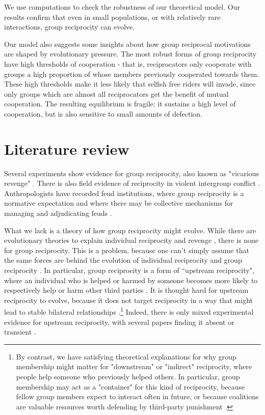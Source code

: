 \documentclass[12pt,a4paper]{article}
\begin{document}
We use computations to check the robustness of our theoretical model. Our
results confirm that even in small populations, or with relatively rare interactions,
group reciprocity can evolve.

Our model also suggests some insights
about how group reciprocal motivations are shaped by evolutionary pressure. The 
most robust forms of group reciprocity have high thresholds of cooperation - that is, reciprocators only cooperate with groups a high proportion of whose members previously
cooperated towards them. These high thresholds make it less likely that selfish
free riders will invade, since only groups which are almost all reciprocators
get the benefit of mutual cooperation. The resulting equilibrium is 
fragile: it sustains a high level of cooperation, but is also sensitive 
to small amounts of defection.

\section{Literature review}

Several experiments show evidence for group reciprocity, also known as "vicarious
revenge" \parencite{lickel_vicarious_2006,gaertner2008whenrejection,stenstrom_roles_2008,hugh2017intergroup,hugh2019humans,romano2022direct}. There is also field 
evidence of reciprocity in violent intergroup conflict \parencite{haushofer_both_2010}.
Anthropologists have recorded feud institutions, where group reciprocity is a
normative expectation and where there may be collective mechanisms for managing 
and adjudicating feuds \parencite{boehm1984blood,chagnon1988lifehistories}. 

What we lack is a theory of how group reciprocity might evolve. While there
are evolutionary theories to explain individual reciprocity and revenge
\parencite{mccullough2013cognitive}, there is none for group reciprocity. This is
a problem, because one can't simply assume that the same forces are behind the evolution of 
individual reciprocity and group reciprocity 
\parencite{pietraszewski2013elementary,mccullough2013putting}. 
In particular, group reciprocity is a form of ``upstream reciprocity", where an individual
who is helped or harmed by someone becomes more likely to respectively help 
or harm other third parties \parencite{boyd1989evolution}. It is thought hard 
for upstream reciprocity to evolve,
because it does not target reciprocity in a way that might lead to stable 
bilateral relationships \parencite{nowak2007upstream}.\footnote{By contrast,
we have satisfying theoretical explanations for why group membership might
matter for "downstream" or "indirect" reciprocity, where people help someone
who previously helped others. In particular, group membership may act as a 
"container" for this kind of reciprocity, because fellow group members
expect to interact often in future, or because coalitions are valuable
resources worth defending by third-party punishment
\parencite{yamagishi2000thegroup,romano2022direct,delton2017psychology}.} Indeed,
there is only mixed experimental evidence for upstream reciprocity, with
several papers finding it absent or transient \parencite{ben2004reciprocity,stanca2009measuring,van2016indirect,horita2016transient,greiner2005indirect}.
 
\end{document}
